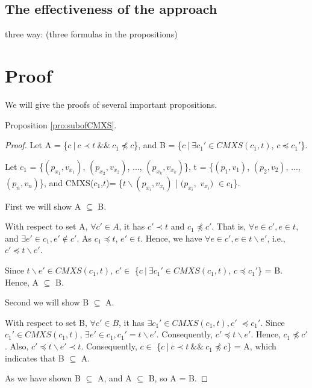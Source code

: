 {\subsection{The effectiveness of the approach}

three way: (three formulas in the propositions)





\appendix
\section{Proof}

We will give the proofs of several important propositions.

Proposition \ref{pro:subofCMXS}.
\begin{proof}

Let A =  \{$c\ |\ c \prec t\ \&\&\ c_{1} \npreceq c$\}, and B = \{$ c\ |\ \exists c_{1}' \in CMXS(c_{1}, t)$, $c \preceq c_{1}'$\}.



Let $c_{1}$ = \{$(p_{x_{1}}, v_{x_{1}})$, $(p_{x_{2}}, v_{x_{2}})$, ..., $(p_{x_{k}}, v_{x_{k}})$\},  t = \{$(p_{1}, v_{1})$, $(p_{2}, v_{2})$, ..., $(p_{n}, v_{n})$\}, and CMXS($c_{1}$,$t$)= \{$t \backslash (p_{x_{i}}, v_{x_{i}})$ | $(p_{x_{i}},$ $v_{x_{i}})$ $ \in c_{1} $\}.

First we will show A $\subseteq$ B.

With respect to set A, $\forall c' \in A$, it has $c' \prec t$ and $ c_{1} \npreceq c'$. That is, $\forall e \in c', e \in t$, and  $\exists e' \in c_{1}, e' \not\in c'$. As $c_{1} \preceq t$, $e' \in t$. Hence, we have $\forall e \in c', e \in t \backslash e'$, i.e., $c' \preceq t \backslash e'$.

Since $t \backslash e' \in CMXS(c_{1}, t)$,  $c' \in $ \{$ c\ |\ \exists c_{1}' \in CMXS(c_{1}, t)$, $c \preceq c_{1}'$\} = B. Hence, A $\subseteq$ B.

Second we will show B $\subseteq$ A.

With respect to set B, $\forall c' \in B$, it has $\exists c_{1}' \in CMXS(c_{1}, t), c'$ $ \preceq c_{1}'$. Since $c_{1}' \in CMXS(c_{1}, t)$, $\exists e' \in c_{1}, c_{1}' =  t \backslash e'$. Consequently, $c' \preceq t \backslash e'$. Hence, $c_{1} \npreceq c'$. Also, $c' \preceq t \backslash e' \prec t$. Consequently, $c \in $  \{$c\ |\ c \prec t\ \&\&\ c_{1} \npreceq c$\} = A, which indicates that B $\subseteq$ A.

As we have shown B $\subseteq$ A, and A $\subseteq$ B, so A = B.


\end{proof}}
